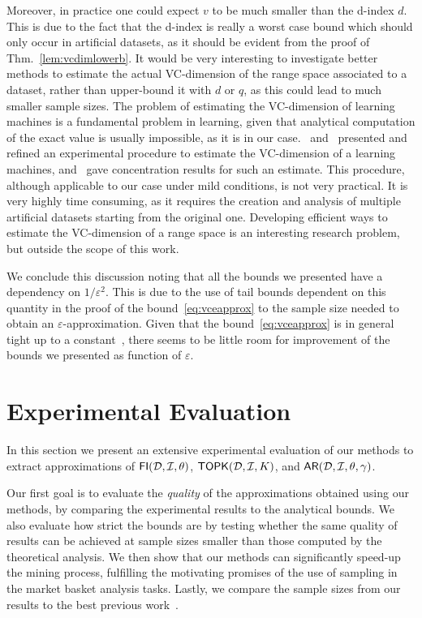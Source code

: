 Moreover, in practice one could expect $v$ to be much smaller than the d-index
$d$. This is due to the fact that the d-index is really a worst case bound which
should only occur in artificial datasets, as it should be evident from the
proof of Thm.~\ref{lem:vcdimlowerb}. It would be very interesting to investigate
better methods to estimate the actual VC-dimension of the range space associated
to a dataset, rather than upper-bound it with $d$ or $q$, as this could lead to
much smaller sample sizes. The problem of estimating the VC-dimension of
learning machines is a fundamental problem in learning, given that analytical
computation of the exact value is usually impossible, as it is in our
case. \citet{VapnikLLC94}~and~\citet{ShaoCL00} presented and refined an
experimental procedure to estimate the VC-dimension of a learning machines,
and~\citet{McDonaldSS11} gave concentration results for such an estimate. This
procedure, although applicable to our case under mild conditions, is not very
practical. It is very highly time consuming, as it requires the creation and
analysis of multiple artificial datasets starting from the original one.
Developing efficient ways to estimate the VC-dimension of a range space is
an interesting research problem, but outside the scope of this work.

We conclude this discussion noting that all the bounds we presented have a
dependency on $1/\varepsilon^2$. This is due to the use of tail bounds dependent
on this quantity in the proof of the bound~\eqref{eq:vceapprox} to the sample size
needed to obtain an $\varepsilon$-approximation. Given that the
bound~\eqref{eq:vceapprox} is in general tight up to a constant~\citep{LiLS01},
there seems to be little room for improvement of the bounds we presented as
function of $\varepsilon$.

\section{Experimental Evaluation}\label{sec:vcmineexp}
In this section we present an extensive experimental evaluation of
our methods to extract approximations of $\mathsf{FI}({\cal D},{\cal I},\theta)$, $\mathsf{TOPK}({\cal D},{\cal I},K)$, and
$\mathsf{AR}({\cal D},{\cal I},\theta,\gamma)$.

Our first goal is to evaluate the \emph{quality} of the
approximations obtained using our methods, by comparing the experimental results 
to the analytical bounds. We also evaluate how strict the bounds are
 by testing whether the same quality of results can be
achieved at sample sizes smaller than those computed by the theoretical analysis. 
We then show that our methods can significantly speed-up the mining process,
fulfilling the motivating promises of the use of sampling in the market basket
analysis tasks. Lastly, we compare the sample sizes from our results to the best
previous work~\citep{ChakaravarthyPS09}.

